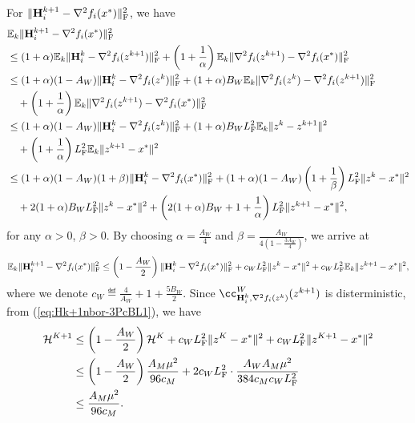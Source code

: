 \documentclass[11pt]{article}
\begin{document}
	
	For $\|\mathbf{H}_i^{k+1} - \nabla^2 f_i(x^*)\|_{\rm F}^2$, we have 
	\begin{align*}
		& \mathbb{E}_k \|\mathbf{H}_i^{k+1} - \nabla^2 f_i(x^*)\|_{\rm F}^2 \\
		& \leq (1 + \alpha) \mathbb{E}_k \|\mathbf{H}_i^k - \nabla^2 f_i (z^{k+1}) \|_{\rm F}^2 + \left(  1 + \frac{1}{\alpha}  \right) \mathbb{E}_k \| \nabla^2 f_i(z^{k+1}) - \nabla^2 f_i(x^*)\|_{\rm F}^2 \\ 
		& \leq (1+\alpha) (1-A_W) \|\mathbf{H}_i^k - \nabla^2 f_i(z^k)\|_{\rm F}^2 + (1+\alpha)B_W \mathbb{E}_k\|\nabla^2 f_i(z^k) - \nabla^2 f_i(z^{k+1})\|_{\rm F}^2 \\ 
		& \quad + \left(  1 + \frac{1}{\alpha}  \right) \mathbb{E}_k \| \nabla^2 f_i(z^{k+1}) - \nabla^2 f_i(x^*)\|_{\rm F}^2 \\ 
		& \leq (1+\alpha) (1-A_W) \|\mathbf{H}_i^k - \nabla^2 f_i(z^k)\|_{\rm F}^2 + (1+\alpha) B_WL_{\rm F}^2 \mathbb{E}_k\|z^k-z^{k+1}\|^2 \\ 
		& \quad +  \left(  1 + \frac{1}{\alpha}  \right) L_{\rm F}^2 \mathbb{E}_k \|z^{k+1}-x^*\|^2 \\ 
		& \leq (1+\alpha) (1-A_W) (1+\beta) \|\mathbf{H}_i^k - \nabla^2 f_i(x^*)\|_{\rm F}^2 + (1+\alpha) (1-A_W) \left(  1 + \frac{1}{\beta}  \right) L_{\rm F}^2 \|z^k-x^*\|^2 \\ 
		& \quad + 2(1+\alpha) B_WL_{\rm F}^2 \|z^k-x^*\|^2 + \left(  2(1+\alpha) B_W + 1 + \frac{1}{\alpha}  \right) L_{\rm F}^2 \|z^{k+1}-x^*\|^2, 
	\end{align*}
	for any $\alpha>0$, $\beta>0$. By choosing $\alpha = \frac{A_W}{4}$ and $\beta = \frac{A_W}{4(1-\frac{3A_W}{4})}$, we arrive at 
	\begin{equation}\label{eq:Hk+1nbor-3PcBL1}
		\mathbb{E}_k \|\mathbf{H}_i^{k+1} - \nabla^2 f_i(x^*)\|_{\rm F}^2 \leq \left(  1 - \frac{A_W}{2}  \right) \|\mathbf{H}_i^k - \nabla^2 f_i(x^*)\|_{\rm F}^2 + c_W L_{\rm F}^2 \|z^k-x^*\|^2 + c_W L_{\rm F}^2 \mathbb{E}_k\|z^{k+1}-x^*\|^2, 
	\end{equation}
	where we denote $c_W \eqdef \frac{4}{A_W} + 1 + \frac{5B_W}{2}$. Since $\cc^W_{\mH_i^k, \nabla^2 f_i(z^k)} (z^{k+1})$ is disterministic, from (\ref{eq:Hk+1nbor-3PcBL1}), we have 
	\begin{align*}
		{\cal H}^{K+1} & \leq \left(  1 - \frac{A_W}{2}  \right) {\cal H}^K + c_WL_{\rm F}^2 \|z^K-x^*\|^2 + c_WL_{\rm F}^2 \|z^{K+1}-x^*\|^2 \\ 
		& \leq \left(  1 - \frac{A_W}{2}  \right) \frac{A_M \mu^2}{96c_M} + 2c_WL_{\rm F}^2 \cdot \frac{A_WA_M \mu^2}{384c_Mc_WL_{\rm F}^2}  \\ 
		& \leq \frac{A_M \mu^2}{96c_M}. 
	\end{align*}
	
\end{document}
